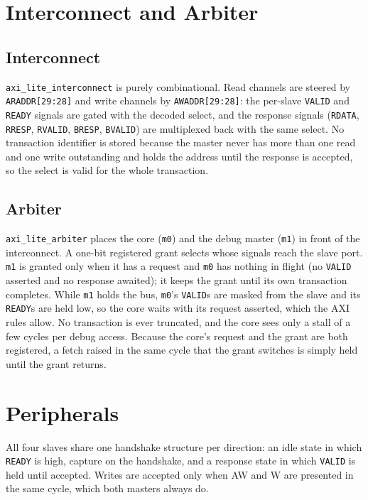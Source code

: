 \documentclass[journal,10pt]{IEEEtran}
\newcommand{\reg}[1]{\texttt{#1}}
\begin{document}
\section{Interconnect and Arbiter}\label{sec:bus}
\subsection{Interconnect}
\reg{axi\_lite\_interconnect} is purely combinational. Read channels are
steered by \reg{ARADDR[29:28]} and write channels by \reg{AWADDR[29:28]}:
the per-slave \reg{VALID} and \reg{READY} signals are gated with the decoded
select, and the response signals (\reg{RDATA}, \reg{RRESP}, \reg{RVALID},
\reg{BRESP}, \reg{BVALID}) are multiplexed back with the same select. No
transaction identifier is stored because the master never has more than one
read and one write outstanding and holds the address until the response is
accepted, so the select is valid for the whole transaction.

\subsection{Arbiter}
\reg{axi\_lite\_arbiter} places the core (\reg{m0}) and the debug master
(\reg{m1}) in front of the interconnect. A one-bit registered grant selects
whose signals reach the slave port. \reg{m1} is granted only when it has a
request and \reg{m0} has nothing in flight (no \reg{VALID} asserted and no
response awaited); it keeps the grant until its own transaction completes.
While \reg{m1} holds the bus, \reg{m0}'s \reg{VALID}s are masked from the
slave and its \reg{READY}s are held low, so the core waits with its request
asserted, which the AXI rules allow. No transaction is ever truncated, and
the core sees only a stall of a few cycles per debug access. Because the
core's request and the grant are both registered, a fetch raised in the same
cycle that the grant switches is simply held until the grant returns.

\section{Peripherals}\label{sec:periph}
All four slaves share one handshake structure per direction: an idle state
in which \reg{READY} is high, capture on the handshake, and a response state
in which \reg{VALID} is held until accepted. Writes are accepted only when
AW and W are presented in the same cycle, which both masters always do.
\end{document}
